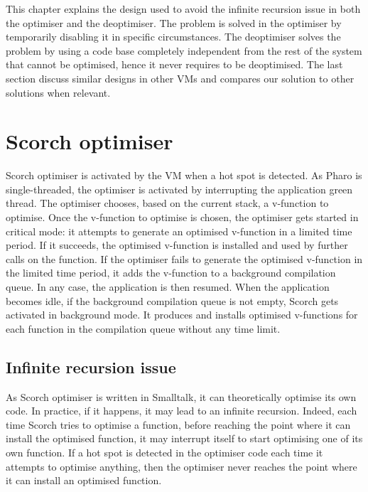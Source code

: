 \documentclass[a4paper,12pt,twoside]{../includes/ThesisStyle}
\begin{document}
This chapter explains the design used to avoid the infinite recursion issue in both the optimiser and the deoptimiser. The problem is solved in the optimiser by temporarily disabling it in specific circumstances. The deoptimiser solves the problem by using a code base completely independent from the rest of the system that cannot be optimised, hence it never requires to be deoptimised. The last section discuss similar designs in other VMs and compares our solution to other solutions when relevant.


\section{Scorch optimiser}

Scorch optimiser is activated by the VM when a hot spot is detected. As Pharo is single-threaded, the optimiser is activated by interrupting the application green thread. The optimiser chooses, based on the current stack, a v-function to optimise.  Once the v-function to optimise is chosen, the optimiser gets started in critical mode: it attempts to generate an optimised v-function in a limited time period. If it succeeds, the optimised v-function is installed and used by further calls on the function. If the optimiser fails to generate the optimised v-function in the limited time period, it adds the v-function to a background compilation queue. In any case, the application is then resumed. When the application becomes idle, if the background compilation queue is not empty, Scorch gets activated in background mode. It produces and installs optimised v-functions for each function in the compilation queue without any time limit. 

\subsection{Infinite recursion issue}

As Scorch optimiser is written in Smalltalk, it can theoretically optimise its own code. In practice, if it happens, it may lead to an infinite recursion. Indeed, each time Scorch tries to optimise a function, before reaching the point where it can install the optimised function, it may interrupt itself to start optimising one of its own function. If a hot spot is detected in the optimiser code each time it attempts to optimise anything, then the optimiser never reaches the point where it can install an optimised function.
\end{document}
